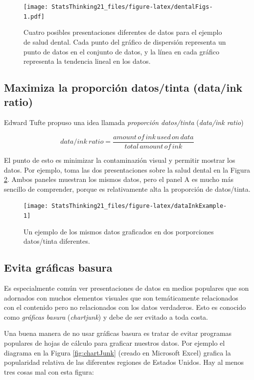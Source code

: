 \documentclass[
  12pt,
]{book}
\begin{document}
\begin{figure}
\centering
\texttt{[image: StatsThinking21\_files/figure-latex/dentalFigs-1.pdf]}
\caption{\label{fig:dentalFigs}Cuatro posibles presentaciones diferentes de datos para el ejemplo de salud dental. Cada punto del gráfico de dispersión representa un punto de datos en el conjunto de datos, y la línea en cada gráfico representa la tendencia lineal en los datos.}
\end{figure}

\hypertarget{maximiza-la-proporciuxf3n-datostinta-dataink-ratio}{%
\subsection{Maximiza la proporción datos/tinta (data/ink ratio)}\label{maximiza-la-proporciuxf3n-datostinta-dataink-ratio}}

Edward Tufte propuso una idea llamada \emph{proporción datos/tinta} (\emph{data/ink ratio})

\[
data/ink\ ratio = \frac{amount\, of\, ink\, used\, on\, data}{total\, amount\, of\, ink}
\]

El punto de esto es minimizar la contaminazión visual y permitir mostrar los datos. Por ejemplo, toma las dos presentaciones sobre la salud dental en la Figura \ref{fig:dataInkExample}. Ambos paneles muestran los mismos datos, pero el panel A es mucho más sencillo de comprender, porque es relativamente alta la proporción de datos/tinta.

\begin{figure}
\texttt{[image: StatsThinking21\_files/figure-latex/dataInkExample-1]} \caption{Un ejemplo de los mismos datos graficados en dos porporciones datos/tinta diferentes.}\label{fig:dataInkExample}
\end{figure}

\hypertarget{evita-gruxe1ficas-basura}{%
\subsection{Evita gráficas basura}\label{evita-gruxe1ficas-basura}}

Es especialmente común ver presentaciones de datos en medios populares que son adornados con muchos elementos visuales que son temáticamente relacionados con el contenido pero no relacionados con los datos verdaderos. Esto es conocido como \emph{gráficas basura} (\emph{chartjunk}) y debe de ser evitado a toda costa.

Una buena manera de no usar gráficas basura es tratar de evitar programas populares de hojas de cálculo para graficar nuestros datos. Por ejemplo el diagrama en la Figura \ref{fig:chartJunk} (creado en Microsoft Excel) grafica la popularidad relativa de las diferentes regiones de Estados Unidos. Hay al menos tres cosas mal con esta figura:
\end{document}

